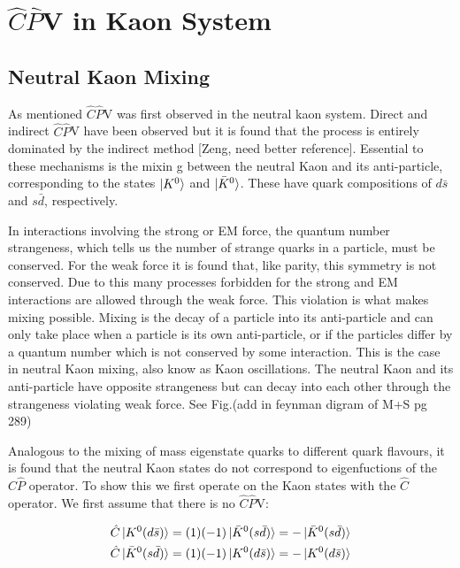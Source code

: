 \section{$\hat{C}\hat{P}$V in Kaon System} 

\subsection{Neutral Kaon Mixing}

As mentioned $\hat{C}\hat{P}$V was first observed in the neutral kaon system. Direct and indirect $\hat{C}\hat{P}$V have been observed but it is found that the process is entirely dominated by the indirect method [Zeng, need better reference]. Essential to these mechanisms is the mixin
g between the neutral Kaon and its anti-particle, corresponding to the states $\ket{K^{0}}$ and $\ket{\bar{K}^{0}}$. These have quark compositions of $d \bar{s}$ and $s \bar{d}$, respectively. 

In interactions involving the strong or EM force, the quantum number strangeness, which tells us the number of strange quarks in a particle, must be conserved. For the weak force it is found that, like parity, this symmetry is not conserved. Due to this many processes forbidden for the strong and EM interactions are allowed through the weak force. This violation is what makes mixing possible. Mixing is the decay of a particle into its anti-particle and can only take place when a particle is its own anti-particle, or if the particles differ by a quantum number which is not conserved by some interaction. This is the case in neutral Kaon mixing, also know as Kaon oscillations. The neutral Kaon and its anti-particle have opposite strangeness but can decay into each other through the strangeness violating weak force. See Fig.(add in feynman digram of M+S pg 289) 

Analogous to the mixing of mass eigenstate quarks to different quark flavours, it is found that the neutral Kaon states do not correspond to eigenfuctions of the $\hat{C}\hat{P}$ operator. To show this we first operate on the Kaon states with the $\hat{C}$ operator. We first assume that there is no $\hat{C}\hat{P}$V:

\begin{align*}
\hat{C} \ket{K^{0}(d \bar{s})} = (1)(-1) \ket{\bar{K}^{0}(s \bar{d})} = - \ket{\bar{K}^{0}(s \bar{d})}  \\
\hat{C} \ket{\bar{K}^{0}(s \bar{d})} = (1)(-1) \ket{K^{0}(d \bar{s})} = - \ket{K^{0}(d \bar{s})}  
\end{align*}

